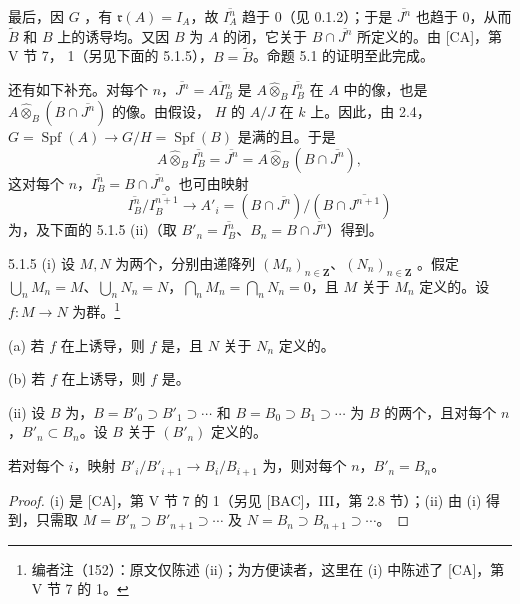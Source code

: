 最后，因 $G$ ，有 $\mathfrak r(A)=I_A$，故 $\overline{I_A^n}$ 趋于 $0$（见 0.1.2）；于是 $\overline{J^n}$ 也趋于 $0$，从而 $\widetilde B$ 和 $B$ 上的诱导均。又因 $B$ 为 $A$ 的闭，它关于 $B\cap\overline{J^n}$ 所定义的。由 [CA]，第 V 节 7， 1（另见下面的 5.1.5），$B=\widetilde B$。命题 5.1 的证明至此完成。

还有如下补充。对每个 $n$，$\overline{J^n}=\overline{AI_B^n}$ 是 $A\widehat\otimes_B\overline{I_B^n}$ 在 $A$ 中的像，也是 $A\widehat\otimes_B(B\cap\overline{J^n})$ 的像。由假设， $H$ 的 $A/J$ 在 $k$ 上。因此，由 2.4， $G=\operatorname{Spf}(A)\to G/H=\operatorname{Spf}(B)$ 是满的且。于是
\[A\widehat\otimes_B\overline{I_B^n}=\overline{J^n}=A\widehat\otimes_B(B\cap\overline{J^n}),\]
这对每个 $n$，$\overline{I_B^n}=B\cap\overline{J^n}$。也可由映射
\[\overline{I_B^n}/\overline{I_B^{n+1}}\longrightarrow A'_i=(B\cap\overline{J^n})/(B\cap\overline{J^{n+1}})\]
为，及下面的 5.1.5 (ii)（取 $B'_n=\overline{I_B^n}$、$B_n=B\cap\overline{J^n}$）得到。

\begin{SGAresult}{}{5.1.5}
(i) 设 $M,N$ 为两个，分别由递降列 $(M_n)_{n\in\mathbf Z}$、$(N_n)_{n\in\mathbf Z}$ 。假定 $\bigcup_nM_n=M$、$\bigcup_nN_n=N$，$\bigcap_nM_n=\bigcap_nN_n=0$，且 $M$ 关于 $M_n$ 定义的。设 $f:M\to N$ 为群。\footnote{编者注（152）：原文仅陈述 (ii)；为方便读者，这里在 (i) 中陈述了 [CA]，第 V 节 7 的 1。}

(a) 若 $f$ 在上诱导，则 $f$ 是，且 $N$ 关于 $N_n$ 定义的。

(b) 若 $f$ 在上诱导，则 $f$ 是。

(ii) 设 $B$ 为，$B=B'_0\supset B'_1\supset\cdots$ 和 $B=B_0\supset B_1\supset\cdots$ 为 $B$ 的两个，且对每个 $n$，$B'_n\subset B_n$。设 $B$ 关于 $(B'_n)$ 定义的。

若对每个 $i$，映射 $B'_i/B'_{i+1}\to B_i/B_{i+1}$ 为，则对每个 $n$，$B'_n=B_n$。
\end{SGAresult}
\begin{proof}
(i) 是 [CA]，第 V 节 7 的 1（另见 [BAC]，III，第 2.8 节）；(ii) 由 (i) 得到，只需取 $M=B'_n\supset B'_{n+1}\supset\cdots$ 及 $N=B_n\supset B_{n+1}\supset\cdots$。
\end{proof}

